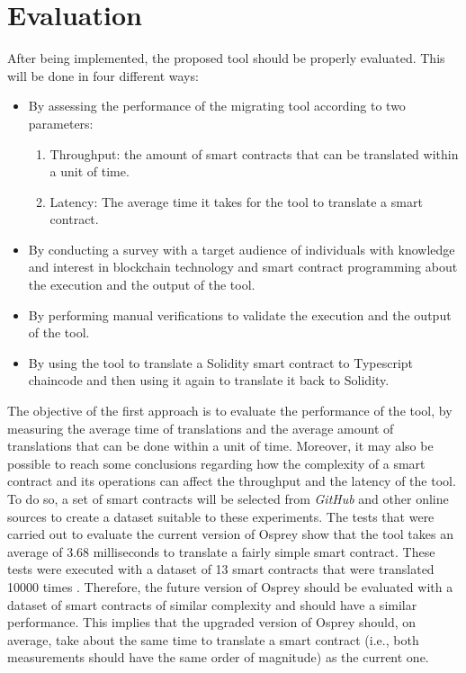 \documentclass[runningheads]{llncs}
\begin{document}

\section{Evaluation} \label{evaluation}

After being implemented, the proposed tool should be properly evaluated. This will be done in four different ways:
\begin{itemize}
    \item By assessing the performance of the migrating tool according to two parameters:
    \begin{enumerate}
        \item Throughput: the amount of smart contracts that can be translated within a unit of time.
        \item Latency: The average time it takes for the tool to translate a smart contract.
    \end{enumerate}
    \item By conducting a survey with a target audience of individuals with knowledge and interest in blockchain technology and smart contract programming about the execution and the output of the tool.
    \item By performing manual verifications to validate the execution and the output of the tool.
    \item By using the tool to translate a Solidity smart contract to Typescript chaincode and then using it again to translate it back to Solidity.
\end{itemize}

The objective of the first approach is to evaluate the performance of the tool, by measuring the average time of translations and the average amount of translations that can be done within a unit of time. Moreover, it may also be possible to reach some conclusions regarding how the complexity of a smart contract and its operations can affect the throughput and the latency of the tool. To do so, a set of smart contracts will be selected from \textit{GitHub} and other online sources to create a dataset suitable to these experiments. %
The tests that were carried out to evaluate the current version of Osprey show that the tool takes an average of 3.68 milliseconds to translate a fairly simple smart contract. These tests were executed with a dataset of 13 smart contracts that were translated 10000 times \cite{abrunhosa_2021}. Therefore, the future version of Osprey should be evaluated with a dataset of smart contracts of similar complexity and should have a similar performance. This implies that the upgraded version of Osprey should, on average, take about the same time to translate a smart contract (i.e., both measurements should have the same order of magnitude) as the current one.
\end{document}
